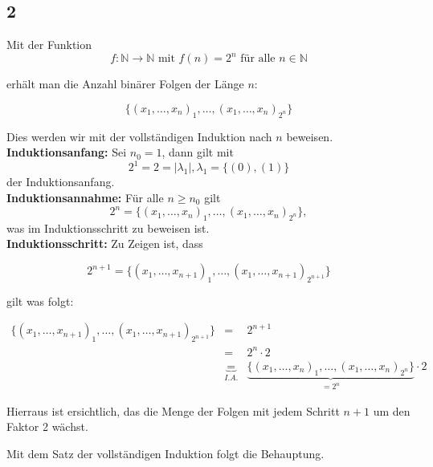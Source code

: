 \documentclass[12pt]{article}
\newcommand{\N}{\mathbb{N}}
\begin{document}
\subsection*{2}
Mit der Funktion 
$$f:\N \rightarrow \N \text{ mit } f(n) = 2^n \text{ für alle }n \in \N$$

erhält man die Anzahl binärer Folgen der Länge $n$:

\begin{equation*}
\{(x_1, \dots , x_n)_1, \dots ,(x_1, \dots, x_n)_{2^n} \} 
\end{equation*}


 Dies werden wir mit der vollständigen Induktion
nach $n$ beweisen. \\

\textbf{Induktionsanfang: } Sei $n_0=1$, dann gilt mit
\begin{equation*}
2^1 = 2 = |\lambda_1|, \lambda_1 = \{(0), (1)\}
\end{equation*}
 der Induktionsanfang. \\

 \textbf{Induktionsannahme: } Für alle $n \ge n_0$ gilt 
 \begin{equation*}
 2^n = \{(x_1, \dots , x_n)_1, \dots ,(x_1, \dots, x_n)_{2^n} \} ,
\end{equation*}
was im Induktionsschritt zu beweisen ist. \\

\textbf{Induktionsschritt: } Zu Zeigen ist, dass

\begin{equation*}
 2^{n+1} = \{(x_1, \dots , x_{n+1})_1, \dots ,(x_1, \dots, x_{n+1})_{2^{n+1}} \}
\end{equation*}

gilt was folgt:

 \begin{eqnarray*}
  \{(x_1, \dots , x_{n+1})_1, \dots ,(x_1, \dots, x_{n+1})_{2^{n+1}} \} &=& 2^{n+1}\\
 &=& 2^n \cdot 2  \\
  &\underbrace{=}_{I.A.}&  \underbrace{\{(x_1, \dots , x_n)_1, \dots ,(x_1, \dots, x_n)_{2^n} \}}_{=2^n}  \cdot 2
\end{eqnarray*}

Hierraus ist ersichtlich, das die Menge der Folgen mit jedem Schritt $n+1$ um den Faktor 2 wächst.

Mit dem Satz der vollständigen Induktion folgt die Behauptung.
\end{document}
